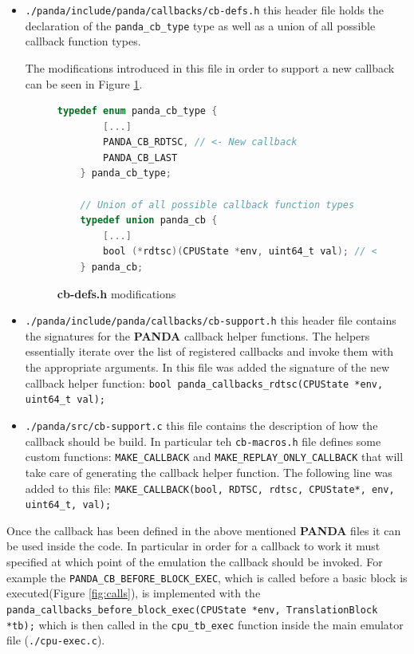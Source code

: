 \begin{itemize}
    \item \lstinline{./panda/include/panda/callbacks/cb-defs.h} this header file holds the declaration of the \lstinline{panda_cb_type} type as well as a union of all possible callback function types.
    
    The modifications introduced in this file in order to support a new callback can be seen in Figure \ref{fig:mod1}.
    
    \begin{figure}[htp]
    \centering
    \begin{lstlisting}[language=C]
    typedef enum panda_cb_type {
        [...]
        PANDA_CB_RDTSC, // <- New callback
        PANDA_CB_LAST
    } panda_cb_type;
    
    // Union of all possible callback function types
    typedef union panda_cb {
        [...]
        bool (*rdtsc)(CPUState *env, uint64_t val); // <- New callback
    } panda_cb;
    \end{lstlisting}
    \caption{\textbf{cb-defs.h} modifications}
    \label{fig:mod1}
    \end{figure}
        
    \item \lstinline{./panda/include/panda/callbacks/cb-support.h} this header file contains the signatures for the \textbf{PANDA} callback helper functions. The helpers essentially iterate over the list of registered callbacks and invoke them with the appropriate arguments. In this file was added the signature of the new callback helper function: 
    \lstinline{bool panda_callbacks_rdtsc(CPUState *env, uint64_t val);}
    
    \item \lstinline{./panda/src/cb-support.c} this file contains the description of how the callback should be build. In particular teh \lstinline{cb-macros.h} file defines some custom functions: \lstinline{MAKE_CALLBACK} and \lstinline{MAKE_REPLAY_ONLY_CALLBACK} that will take care of generating the callback helper function. The following line was added to this file: \lstinline{MAKE_CALLBACK(bool, RDTSC, rdtsc, CPUState*, env, uint64_t, val);}
    
\end{itemize}

Once the callback has been defined in the above mentioned \textbf{PANDA} files it can be used inside the code. In particular in order for a callback to work it must specified at which point of the emulation the callback should be invoked. For example the \lstinline{PANDA_CB_BEFORE_BLOCK_EXEC}, which is called before a basic block is executed(Figure \ref{fig:calls}), is implemented with the \lstinline{panda_callbacks_before_block_exec(CPUState *env, TranslationBlock *tb);} which is then called in the \lstinline{cpu_tb_exec} function inside the main emulator file (\lstinline{./cpu-exec.c}).

